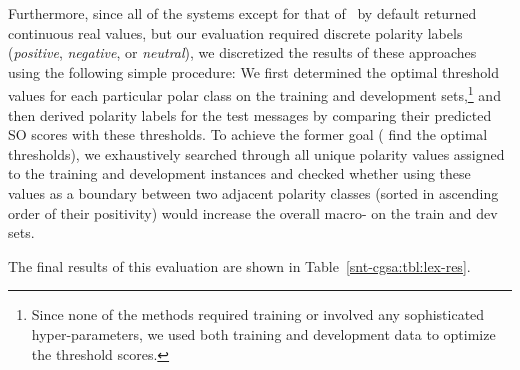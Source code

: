 Furthermore, since all of the systems except for that
of~\citet{Kolchyna:15} by default returned continuous real values, but
our evaluation required discrete polarity labels (\emph{positive},
\emph{negative}, or \emph{neutral}), we discretized the results of
these approaches using the following simple procedure: We first
determined the optimal threshold values for each particular polar
class on the training and development sets,\footnote{Since none of the
  methods required training or involved any sophisticated
  hyper-parameters, we used both training and development data to
  optimize the threshold scores.} and then derived polarity labels for
the test messages by comparing their predicted SO scores with these
thresholds.  To achieve the former goal (\ie{} find the optimal
thresholds), we exhaustively searched through all unique polarity
values assigned to the training and development instances and checked
whether using these values as a boundary between two adjacent polarity
classes (sorted in ascending order of their positivity) would increase
the overall macro-\F{} on the train and dev sets.

The final results of this evaluation are shown in
Table~\ref{snt-cgsa:tbl:lex-res}.

